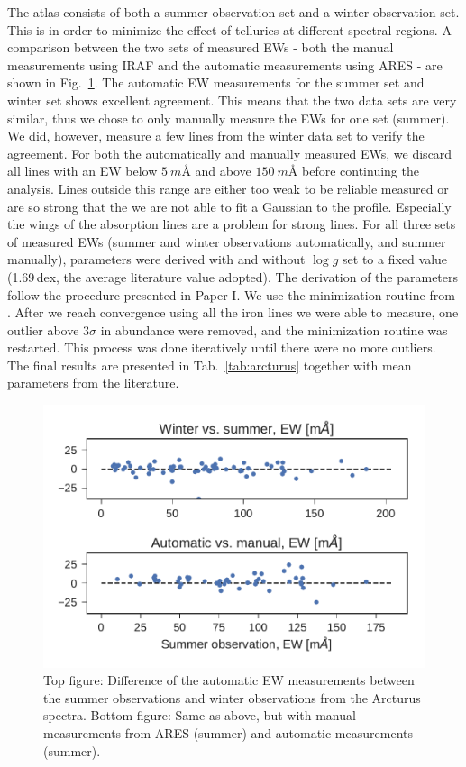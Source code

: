 \documentclass{aa}
\begin{document}
The atlas consists of both a summer observation set and a winter observation
set. This is in order to minimize the effect of tellurics at different spectral
regions. A comparison between the two sets of measured EWs - both the manual
measurements using IRAF and the automatic measurements using ARES - are shown in
Fig.~\ref{fig:EWcomp}. The automatic EW measurements for the summer set and
winter set shows excellent agreement. This means that the two data sets are very
similar, thus we chose to only manually measure the EWs for one set (summer). We
did, however, measure a few lines from the winter data set to verify the
agreement. For both the automatically and manually measured EWs, we discard all
lines with an EW below $\SI{5}{m}$\AA{} and above $\SI{150}{m}$\AA{} before
continuing the analysis. Lines outside this range are either too weak to be
reliable measured or are so strong that the we are not able to fit a Gaussian to
the profile. Especially the wings of the absorption lines are a problem for
strong lines. For all three sets of measured EWs (summer and winter observations
automatically, and summer manually), parameters were derived with and without
$\log g$ set to a fixed value (1.69\,dex, the average literature value adopted).
The derivation of the parameters follow the procedure presented in Paper I. We
use the minimization routine from \citet{Andreasen2017a}. After we reach
convergence using all the iron lines we were able to measure, one outlier above
$3\sigma$ in abundance were removed, and the minimization routine was restarted.
This process was done iteratively until there were no more outliers. The final
results are presented in Tab.~\ref{tab:arcturus} together with mean parameters
from the literature.


\begin{figure}[htpb!]
    \centering
    \includegraphics[width=1.0\linewidth]{figures/EWcomp.pdf}
    \caption{Top figure: Difference of the automatic EW measurements between the
             summer observations and winter observations from the Arcturus
             spectra. Bottom figure: Same as above, but with manual measurements
             from ARES (summer) and automatic measurements (summer).}
    \label{fig:EWcomp}
\end{figure}
\end{document}
